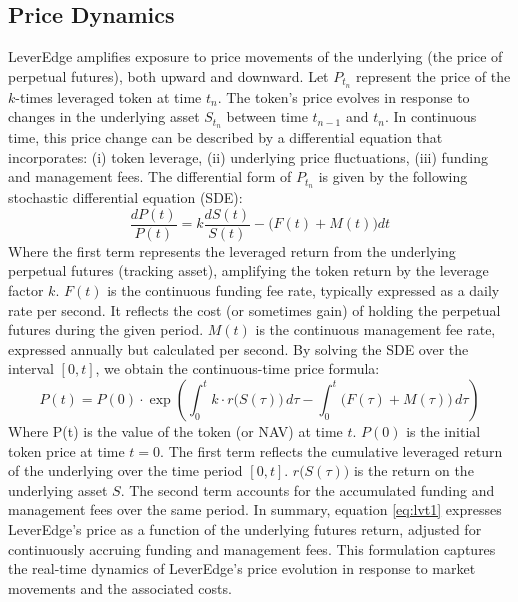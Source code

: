 \subsection{Price Dynamics}
LeverEdge amplifies exposure to price movements of the underlying (the price of perpetual futures), both upward and downward. Let \( P_{t_n} \) represent the price of the \(k\)-times leveraged token at time \( t_n \). The token’s price evolves in response to changes in the underlying asset \( S_{t_n} \) between time \( t_{n-1} \) and \( t_n \). In continuous time, this price change can be described by a differential equation that incorporates: (i) token leverage, (ii) underlying price fluctuations, (iii) funding and management fees. The differential form of \(P_{t_n}\) is given by the following stochastic differential equation (SDE):
\begin{equation*}
	\frac{dP(t)}{P(t)} = k \frac{dS(t)}{S(t)} - \big(F(t) + M(t)\big)dt
\end{equation*}
Where the first term represents the leveraged return from the underlying perpetual futures (tracking asset), amplifying the token return by the leverage factor \(k\). \(F(t)\) is the continuous funding fee rate, typically expressed as a daily rate per second. It reflects the cost (or sometimes gain) of holding the perpetual futures during the given period. \(M(t)\) is the continuous management fee rate, expressed annually but calculated per second. By solving the SDE over the interval \([0, t]\), we obtain the continuous-time price formula:
\begin{equation}\label{eq:lvt1}
	P(t) = P(0) \cdot \exp\left( \int_0^t k \cdot r\big(S(\tau)\big) \, d\tau - \int_0^t \big( F(\tau) + M(\tau) \big) \, d\tau \right)
\end{equation}
Where P(t) is the value of the token (or NAV) at time \(t\). \(P(0)\) is the initial token price at time \(t=0\). The first term reflects the cumulative leveraged return of the underlying over the time period \([0,t]\). \(r\big(S(\tau)\big)\) is the return on the underlying asset \(S\). The second term accounts for the accumulated funding and management fees over the same period. In summary, equation \ref{eq:lvt1} expresses LeverEdge's price as a function of the underlying futures return, adjusted for continuously accruing funding and management fees. This formulation captures the real-time dynamics of LeverEdge's price evolution in response to market movements and the associated costs.

